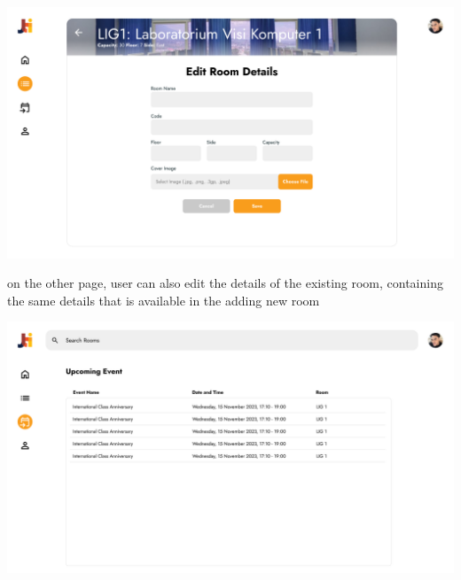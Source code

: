 \documentclass[12pt,titlepage,a4paper]{report}
\begin{document}
    \begin{center}
        \includegraphics[width=\textwidth]{images/figures/UIUX/edit_room_details.png}\\
    \end{center}
    on the other page, user can also edit the details of the existing room, containing the same details that is available in the adding new room
    \begin{center}
        \includegraphics[width=\textwidth]{images/figures/UIUX/upcoming 1.png}\\
    \end{center}
\end{document}
